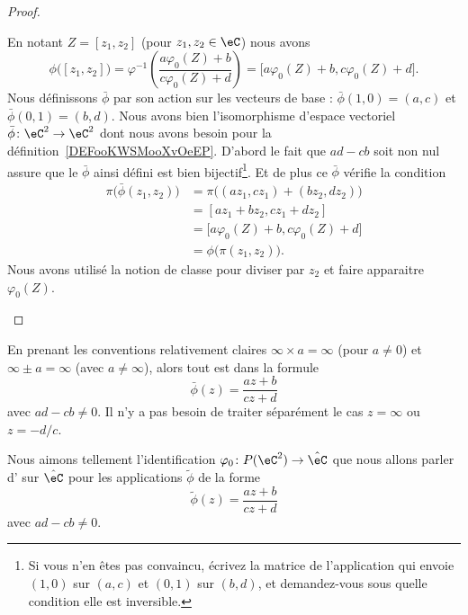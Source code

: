 \begin{proof}
\begin{subproof}
    En notant \( Z=[z_1,z_2]\) (pour \( z_1,z_2\in \eC\)) nous avons
    \begin{equation}
        \phi\big( [z_1,z_2] \big)=\varphi^{-1}\left( \frac{ a\varphi_0(Z)+b }{ c\varphi_0(Z)+d } \right)=\big[ a\varphi_0(Z)+b,c\varphi_0(Z)+d \big].
    \end{equation}
    Nous définissons \( \bar\phi\) par son action sur les vecteurs de base : \( \bar\phi(1,0)=(a,c)\) et \( \bar\phi(0,1)=(b,d)\). Nous avons bien l'isomorphisme d'espace vectoriel \( \bar\phi\colon \eC^2\to \eC^2\) dont nous avons besoin pour la définition~\ref{DEFooKWSMooXvOeEP}. D'abord le fait que \( ad-cb\) soit non nul assure que le \( \bar\phi\) ainsi défini  est bien bijectif\footnote{Si vous n'en êtes pas convaincu, écrivez la matrice de l'application qui envoie \( (1,0)\) sur \( (a,c)\) et \( (0,1)\) sur \( (b,d)\), et demandez-vous sous quelle condition elle est inversible.}. Et de plus ce \( \bar\phi\) vérifie la condition
    \begin{subequations}
        \begin{align}
            \pi\big( \bar\phi(z_1,z_2) \big)&=\pi\big( (az_1,cz_1)+(bz_2,dz_2) \big)\\
            &=[az_1+bz_2,cz_1+dz_2]\\
            &=\big[ a\varphi_0(Z)+b,c\varphi_0(Z)+d \big]\\
            &=\phi\big( \pi(z_1,z_2) \big).
        \end{align}
    \end{subequations}
    Nous avons utilisé la notion de classe pour diviser par \( z_2\) et faire apparaitre \( \varphi_0(Z)\).
    \end{subproof}
\end{proof}

\begin{remark}
    En prenant les conventions relativement claires \( \infty\times a=\infty\) (pour \( a\neq 0\)) et \( \infty\pm a=\infty\) (avec \( a\neq \infty\)), alors tout est dans la formule
    \begin{equation}
        \bar\phi(z)=\frac{ az+b }{ cz+d }
    \end{equation}
    avec \( ad-cb\neq 0\). Il n'y a pas besoin de traiter séparément le cas \( z=\infty\) ou \( z=-d/c\).
\end{remark}


\begin{definition}      \label{DEFooAMQHooPFUgIa}
    Nous aimons tellement l'identification \( \varphi_0\colon P(\eC^2)\to \hat \eC\) que nous allons parler d' sur \( \hat \eC\) pour les applications \( \tilde \phi\) de la forme
    \begin{equation}
        \tilde \phi(z)=\frac{ az+b }{ cz+d }
    \end{equation}
    avec \( ad-cb\neq 0\).
\end{definition}

